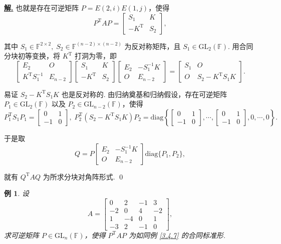 \documentclass[10pt,openany]{article}
\theoremstyle{thmstyle} %
\theoremstyle{defstyle} %
\theoremstyle{prostyle} %
\theoremstyle{exastyle}
\newtheorem{example}[theorem]{例}
\theoremstyle{remstyle}
\newenvironment{solution}{\par\underline{\textbf{解.}} \;\fangsong}{\qed\par}
\newcommand{\T}{^{\text{T}}}
\newcommand{\F}{\mathbb{F}}
\newcommand{\gfn}{\text{GL}_n(\mathbb{F})}
\newcommand{\diag}{\mathrm{diag}}
\begin{document}
\begin{solution}
	也就是存在可逆矩阵 \( P=E(2,i)E(1,j) \)，使得
	\[ P\T AP=\begin{bmatrix}
		S_1 & K \\
		-K\T & S_2
	\end{bmatrix}, \]
	
	其中 \( S_1 \in \F^{2 \times 2}, \; S_2 \in \F^{(n-2) \times (n-2)} \) 为反对称矩阵，且 \( S_1 \in \text{GL}_2(\F) \). 用合同分块初等变换，将 \( K\T \) 打洞为零，即
	\[ \begin{bmatrix}
		E_2 & O \\
		K\T S_1^{-1} & E_{n-2} 
	\end{bmatrix}\begin{bmatrix}
	S_1 & K \\
	-K\T & S_2
	\end{bmatrix}\begin{bmatrix}
	E_2 & -S_1^{-1} K \\
	O  & E_{n-2} 
	\end{bmatrix}=\begin{bmatrix}
	S_1 & O \\
	O & S_2-K\T S_1 K
	\end{bmatrix}. \]
	
	易证 \( S_2-K\T S_1 K \) 也是反对称的. 由归纳奠基和归纳假设，存在可逆矩阵 \( P_1 \in \text{GL}_2(\F) \) 以及 \( P_2 \in \text{GL}_{n-2}(\F) \)，使得 
	\[ P_1\T S_1P_1=\begin{bmatrix}
		0 & 1 \\
		-1 & 0
	\end{bmatrix}, \; P_2\T (S_2-K\T S_1 K) P_2=\diag\left\{ \begin{bmatrix}
	0 & 1 \\
	-1 & 0
	\end{bmatrix}, \cdots, \begin{bmatrix}
	0 & 1 \\
	-1 & 0
	\end{bmatrix}, 0,\cdots, 0 \right\}. \] 
	
	于是取
	\[ Q=P\begin{bmatrix}
		E_2 & -S_1^{-1} K \\
		O  & E_{n-2} 
	\end{bmatrix} \diag\{P_1,P_2\}, \]
	
	就有 \( Q\T AQ \) 为所求分块对角阵形式.
\end{solution}

\begin{example}
	设
	\[ A=\begin{bmatrix}
		0 & 2 & -1 & 3 \\
		-2 & 0 & 4 & -2 \\
		1 & -4 & 0 & 1 \\
		-3 & 2 & -1 & 0
	\end{bmatrix}, \]
	求可逆矩阵 \( P \in \gfn \)，使得 \( P\T AP \) 为如同例 \ref{3.4.7} 的合同标准形.
\end{example}
\end{document}
